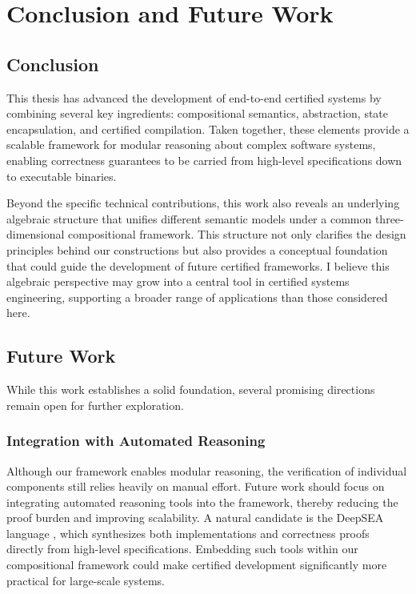 \chapter{Conclusion and Future Work}
\label{ch:conclusion}

\section{Conclusion}

This thesis has advanced
the development of end-to-end certified systems
by combining several key ingredients:
compositional semantics, abstraction, state encapsulation, and certified compilation.
Taken together,
these elements provide a scalable framework
for modular reasoning about complex software systems,
enabling correctness guarantees
to be carried from high-level specifications
down to executable binaries.

Beyond the specific technical contributions,
this work also reveals an underlying algebraic structure
that unifies different semantic models
under a common three-dimensional compositional framework.
This structure not only clarifies
the design principles behind our constructions
but also provides a conceptual foundation
that could guide the development of future certified frameworks.
I believe this algebraic perspective
may grow into a central tool
in certified systems engineering,
supporting a broader range of applications
than those considered here.

\section{Future Work}

While this work establishes a solid foundation,
several promising directions remain open
for further exploration.

\subsection{Integration with Automated Reasoning}

Although our framework enables modular reasoning,
the verification of individual components
still relies heavily on manual effort.
Future work should focus on integrating automated reasoning tools
into the framework,
thereby reducing the proof burden
and improving scalability.
A natural candidate is
the DeepSEA language \citep{deepsea},
which synthesizes both implementations and correctness proofs
directly from high-level specifications.
Embedding such tools within our compositional framework
could make certified development significantly
more practical for large-scale systems.

